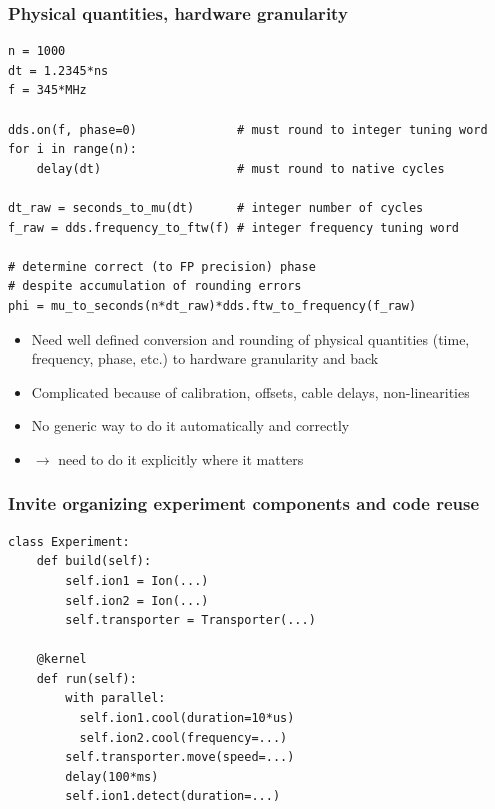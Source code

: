 \documentclass[final,presentation,compress]{beamer}
\begin{document}
\begin{frame}[fragile]
  \frametitle{Physical quantities, hardware granularity}
  \footnotesize
  \begin{verbatim}
n = 1000
dt = 1.2345*ns
f = 345*MHz

dds.on(f, phase=0)              # must round to integer tuning word
for i in range(n):
    delay(dt)                   # must round to native cycles

dt_raw = seconds_to_mu(dt)      # integer number of cycles
f_raw = dds.frequency_to_ftw(f) # integer frequency tuning word

# determine correct (to FP precision) phase
# despite accumulation of rounding errors
phi = mu_to_seconds(n*dt_raw)*dds.ftw_to_frequency(f_raw)
  \end{verbatim}

  \begin{itemize}
    \item Need well defined conversion and rounding of physical quantities
      (time, frequency, phase, etc.) to hardware granularity and back
    \item Complicated because of calibration, offsets, cable delays,
      non-linearities
    \item No generic way to do it automatically and correctly
    \item $\rightarrow$ need to do it explicitly where it matters
  \end{itemize}
\end{frame}


\begin{frame}[fragile]
  \frametitle{Invite organizing experiment components and code reuse}
  \footnotesize

  \begin{verbatim}
class Experiment:
    def build(self):
        self.ion1 = Ion(...)
        self.ion2 = Ion(...)
        self.transporter = Transporter(...)

    @kernel
    def run(self):
        with parallel:
          self.ion1.cool(duration=10*us)
          self.ion2.cool(frequency=...)
        self.transporter.move(speed=...)
        delay(100*ms)
        self.ion1.detect(duration=...)
  \end{verbatim}
\end{frame}
\end{document}
